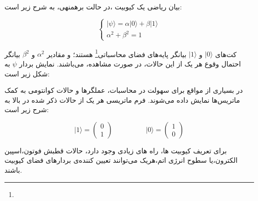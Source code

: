 \documentclass{book}
\begin{document}
\pagebreak

بیان ریاضی یک کیوبیت ،در حالت برهمنهی، به شرح زیر است:
\vspace{0.5cm}

\begin{equation}\label{psi ket}
	\left\{
	\begin{array}{ll}
		\vert \psi \rangle = \alpha\vert 0 \rangle + \beta\vert 1 \rangle \\
		\alpha^2 + \beta^2 = 1
	\end{array}
	\right.
\end{equation}

کت‌های $\vert 0 \rangle$ و $\vert 1 \rangle$ بیانگر پایه‌های فضای محاسباتی\footnote{} هستند؛ و مقادیر $\alpha^2$ و $\beta^2$ بیانگر احتمال وقوع هر یک از این حالات، در صورت مشاهده، می‌باشند. نمایش بردار $\psi$ به شکل زیر است:
\begin{center}
\end{center}

در بسیاری از مواقع برای سهولت در محاسبات، عملگر‌ها و حالات کوانتومی به کمک ماتریس‌ها نمایش داده ‌می‌شوند. فرم ماتریسی هر یک از حالات ذکر شده در بالا به شرح زیر است:

\begin{equation}\label{basis ket}
	\vert 1 \rangle = \begin{pmatrix} 0 \\ 1 \end{pmatrix}
	\hspace{2cm}
	\vert 0 \rangle = \begin{pmatrix} 1 \\ 0 \end{pmatrix}	
\end{equation}

برای تعریف کیوبیت ها، راه های زیادی وجود دارد، حالات قطبش فوتون،‌اسپین الکترون،‌یا سطوح انرژی اتم،‌هریک می‌توانند تعیین کننده‌ی بردار‌های فضای کیوبیت باشند.
\end{document}
